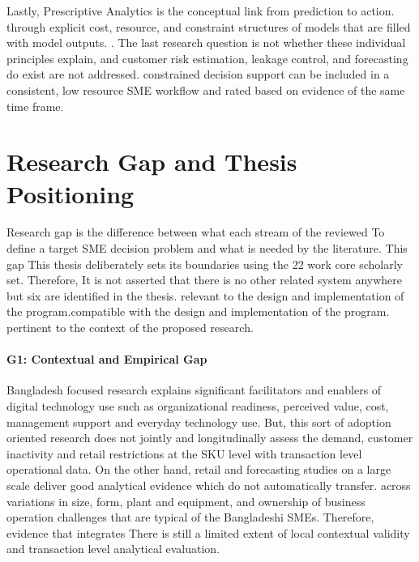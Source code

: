 \documentclass[a4paper,11pt,oneside]{book}
\theoremstyle{plain}
\theoremstyle{definition}
\theoremstyle{remark}
\begin{document}
Lastly, Prescriptive Analytics is the conceptual link from prediction to action. through explicit cost, resource, and constraint structures of models that are filled with model outputs. \cite{bertsimas2020prescriptive}. The last research question is not whether these individual principles explain, and customer risk estimation, leakage control, and forecasting do exist are not addressed. constrained decision support can be included in a consistent, low resource SME workflow and rated based on evidence of the same time frame.

\section{Research Gap and Thesis Positioning}
\label{sec:research_gap}

Research gap is the difference between what each stream of the reviewed To define a target SME decision problem and what is needed by the literature. This gap This thesis deliberately sets its boundaries using the 22 work core scholarly set. Therefore, It is not asserted that there is no other related system anywhere but six are identified in the thesis. relevant to the design and implementation of the program.compatible with the design and implementation of the program. pertinent to the context of the proposed research.

\paragraph{G1: Contextual and Empirical Gap}
Bangladesh focused research explains significant facilitators and enablers of digital technology use such as organizational readiness, perceived value, cost, management support and everyday technology use. But, this sort of adoption oriented research does not jointly and longitudinally assess the demand, customer inactivity and retail restrictions at the SKU level with transaction level operational data. On the other hand, retail and forecasting studies on a large scale deliver good analytical evidence \cite{fildes2022retail,makridakis2022m5} which do not automatically transfer. across variations in size, form, plant and equipment, and ownership of business operation challenges that are typical of the Bangladeshi SMEs. Therefore, evidence that integrates There is still a limited extent of local contextual validity and transaction level analytical evaluation.
\end{document}
